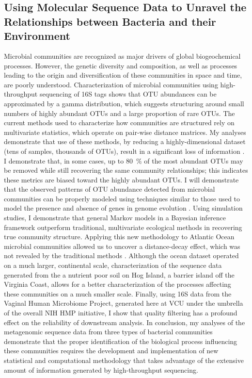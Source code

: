 
\subsection*{Using Molecular Sequence Data to Unravel the Relationships between Bacteria 
and their Environment}

Microbial communities are recognized as major drivers of global biogeochemical processes.  However, 
the genetic diversity and composition, as well as processes leading to the origin and diversification of these 
communities in space and time, are poorly understood.  Characterization of microbial communities using 
high-throughput sequencing of 16S tags shows that OTU abundances can be approximated by a gamma distribution, 
which suggests structuring around small numbers of highly abundant OTUs and a large proportion of rare OTUs.  
The current methods used to characterize how communities are structured rely on multivariate statistics, 
which operate on pair-wise distance matrices.  My analyses demonstrate that use of these methods, by reducing a 
highly-dimensional dataset (tens of samples, thousands of OTUs), result in a significant loss of information 
\citep{Friedline:2012fm}. I demonstrate that, in some cases, up to \SI{80}{\percent} of the most abundant OTUs may be removed while 
still recovering the same community relationships; this indicates these metrics are biased toward the highly abundant OTUs.  I 
will demonstrate that the observed patterns of OTU abundance detected from microbial communities can be properly 
modeled using techniques similar to those used to model the presence and absence of genes in genome 
evolution \citep{Lake:2004cy, Rivera:2004ct}.  Using simulation studies, I demonstrate that general Markov models 
in a Bayesian inference framework outperform traditional, multivariate ecological methods in recovering true community 
structure.  Applying this new methodology to Atlantic Ocean microbial communities allowed us to uncover a distance-decay 
effect, which was not revealed by the traditional methods \citep{Friedline:2012fm}.  Although the ocean dataset operated on a 
much larger, continental scale, characterization of the sequence data generated from the a nutrient poor soil on Hog Island, 
a barrier island off the Virginia Coast, allows for a better characterization of the processes affecting these communities 
on a much smaller scale.  Finally, using 16S data from the Vaginal Human 
Microbiome Project, generated here at VCU under the umbrella of the overall NIH HMP initiative, I show that 
quality filtering has a profound effect on the reliability of downstream analysis.  In conclusion, 
my analyses of the metagenomic sequence data from three types of bacterial communities demonstrate that the proper 
identification of the biological process influencing these communities requires the development and implementation of 
new statistical and computational methodology that takes advantage of the extensive amount of information generated by 
high-throughput sequencing. 

